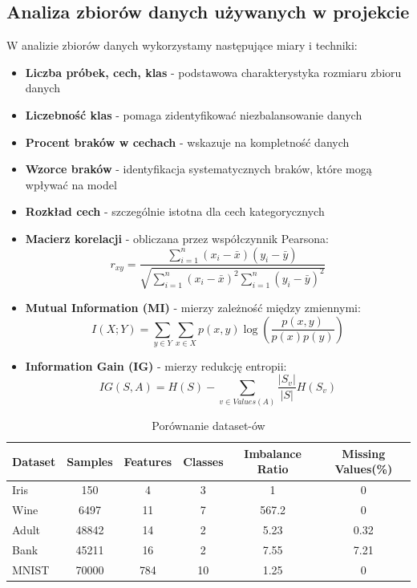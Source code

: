 \documentclass[11pt,a4paper]{article}
\begin{document}
\subsection{Analiza zbiorów danych używanych w projekcie}

W analizie zbiorów danych wykorzystamy następujące miary i techniki:

\begin{itemize}
    \item \textbf{Liczba próbek, cech, klas} - podstawowa charakterystyka rozmiaru zbioru danych
    \item \textbf{Liczebność klas} - pomaga zidentyfikować niezbalansowanie danych
    \item \textbf{Procent braków w cechach} - wskazuje na kompletność danych
    \item \textbf{Wzorce braków} - identyfikacja systematycznych braków, które mogą wpływać na model
    \item \textbf{Rozkład cech} - szczególnie istotna dla cech kategorycznych
    \item \textbf{Macierz korelacji} - obliczana przez współczynnik Pearsona:
    \begin{equation}
    r_{xy} = \frac{\sum_{i=1}^{n}(x_i-\bar{x})(y_i-\bar{y})}{\sqrt{\sum_{i=1}^{n}(x_i-\bar{x})^2 \sum_{i=1}^{n}(y_i-\bar{y})^2}}
    \end{equation}

    \item \textbf{Mutual Information (MI)} - mierzy zależność między zmiennymi:
    \begin{equation}
    I(X;Y) = \sum_{y \in Y} \sum_{x \in X} p(x,y) \log\left(\frac{p(x,y)}{p(x)p(y)}\right)
    \end{equation}
    \item \textbf{Information Gain (IG)} - mierzy redukcję entropii:
    \begin{equation}
    IG(S, A) = H(S) - \sum_{v \in Values(A)} \frac{|S_v|}{|S|} H(S_v)
    \end{equation}
\end{itemize}

\begin{table}[H]
\caption{Porównanie dataset-ów}
\label{tab:dataset_comparison}
\begin{tabular}{lccccc}
\toprule
Dataset & Samples & Features & Classes & Imbalance Ratio & Missing Values(\%) \\
\midrule
Iris & 150 & 4 & 3 & 1 & 0 \\
Wine & 6497 & 11 & 7 & 567.2 & 0 \\
Adult & 48842 & 14 & 2 & 5.23 & 0.32 \\
Bank & 45211 & 16 & 2 & 7.55 & 7.21 \\
MNIST & 70000 & 784 & 10 & 1.25 & 0 \\
\bottomrule
\end{tabular}
\end{table}
\end{document}
